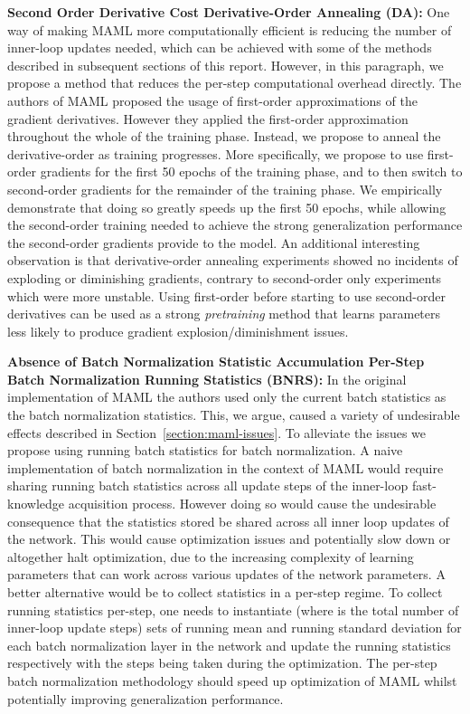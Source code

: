 \documentclass{article} \usepackage[dvipsnames]{xcolor}
\begin{document}
\textbf{Second Order Derivative Cost  Derivative-Order Annealing (DA):} One way of making MAML more computationally efficient is reducing the number of inner-loop updates needed, which can be achieved with some of the methods described in subsequent sections of this report. However, in this paragraph, we propose a method that reduces the per-step computational overhead directly. The authors of MAML proposed the usage of first-order approximations of the gradient derivatives. However they applied the first-order approximation throughout the whole of the training phase. Instead, we propose to anneal the derivative-order as training progresses. More specifically, we propose to use first-order gradients for the first 50 epochs of the training phase, and to then switch to second-order gradients for the remainder of the training phase. We empirically demonstrate that doing so greatly speeds up the first 50 epochs, while allowing the second-order training needed to achieve the strong generalization performance the second-order gradients provide to the model. An additional interesting observation is that derivative-order annealing experiments showed no incidents of exploding or diminishing gradients, contrary to second-order only experiments which were more unstable. Using first-order before starting to use second-order derivatives can be used as a strong \emph{pretraining} method that learns parameters less likely to produce gradient explosion/diminishment issues.

\textbf{Absence of Batch Normalization Statistic Accumulation  Per-Step Batch Normalization Running Statistics (BNRS):} In the original implementation of MAML \cite{finn2017model} the authors used only the current batch statistics as the batch normalization statistics. This, we argue, caused a variety of undesirable effects described in Section~\ref{section:maml-issues}. To alleviate the issues we propose using running batch statistics for batch normalization. A naive implementation of batch normalization in the context of MAML would require sharing running batch statistics across all update steps of the inner-loop fast-knowledge acquisition process. However doing so would cause the undesirable consequence that the statistics stored be shared across all inner loop updates of the network. This would cause optimization issues and potentially slow down or altogether halt optimization, due to the increasing complexity of learning parameters that can work across various updates of the network parameters. A better alternative would be to collect statistics in a per-step regime. To collect running statistics per-step, one needs to instantiate  (where  is the total number of inner-loop update steps) sets of running mean and running standard deviation for each batch normalization layer in the network and update the running statistics respectively with the steps being taken during the optimization. The per-step batch normalization methodology should speed up optimization of MAML whilst potentially improving generalization performance.
\end{document}
